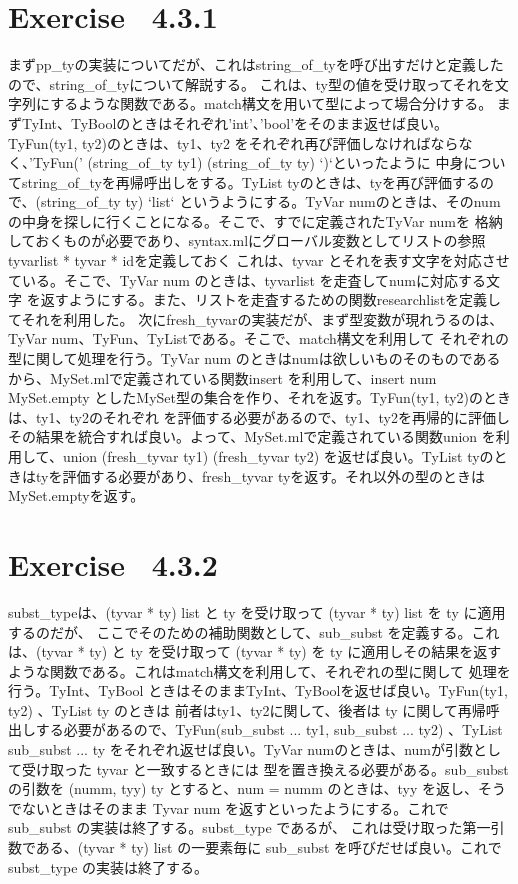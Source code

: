 \documentclass{jreport}
\begin{document}
\section{Exercise \ 4.3.1}
まずpp\_tyの実装についてだが、これはstring\_of\_tyを呼び出すだけと定義したので、string\_of\_tyについて解説する。
これは、ty型の値を受け取ってそれを文字列にするような関数である。match構文を用いて型によって場合分けする。
まずTyInt、TyBoolのときはそれぞれ'int'、'bool'をそのまま返せば良い。TyFun(ty1, ty2)のときは、ty1、ty2
をそれぞれ再び評価しなければならなく、'TyFun('  (string\_of\_ty ty1)  (string\_of\_ty ty) `)`といったように
中身についてstring\_of\_tyを再帰呼出しをする。TyList tyのときは、tyを再び評価するので、(string\_of\_ty ty) `list`
というようにする。TyVar numのときは、そのnumの中身を探しに行くことになる。そこで、すでに定義されたTyVar numを
格納しておくものが必要であり、syntax.mlにグローバル変数としてリストの参照tyvarlist * tyvar * idを定義しておく
これは、tyvar とそれを表す文字を対応させている。そこで、TyVar num のときは、tyvarlist を走査してnumに対応する文字
を返すようにする。また、リストを走査するための関数researchlistを定義してそれを利用した。
次にfresh\_tyvarの実装だが、まず型変数が現れうるのは、TyVar num、TyFun、TyListである。そこで、match構文を利用して
それぞれの型に関して処理を行う。TyVar num のときはnumは欲しいものそのものであるから、MySet.mlで定義されている関数insert
を利用して、insert num MySet.empty としたMySet型の集合を作り、それを返す。TyFun(ty1, ty2)のときは、ty1、ty2のそれぞれ
を評価する必要があるので、ty1、ty2を再帰的に評価しその結果を統合すれば良い。よって、MySet.mlで定義されている関数union
を利用して、union (fresh\_tyvar ty1) (fresh\_tyvar ty2) を返せば良い。TyList tyのときはtyを評価する必要があり、fresh\_tyvar tyを返す。それ以外の型のときはMySet.emptyを返す。
\section{Exercise \ 4.3.2}
subst\_typeは、(tyvar * ty) list と ty を受け取って (tyvar * ty) list を ty に適用するのだが、
ここでそのための補助関数として、sub\_subst を定義する。これは、(tyvar * ty) と ty を受け取って
(tyvar * ty) を ty に適用しその結果を返すような関数である。これはmatch構文を利用して、それぞれの型に関して
処理を行う。TyInt、TyBool ときはそのままTyInt、TyBoolを返せば良い。TyFun(ty1, ty2) 、TyList ty のときは
前者はty1、ty2に関して、後者は ty に関して再帰呼出しする必要があるので、TyFun(sub\_subst ... ty1, sub\_subst ... ty2)
、TyList sub\_subst ... ty をそれぞれ返せば良い。TyVar numのときは、numが引数として受け取った tyvar と一致するときには
型を置き換える必要がある。sub\_subst の引数を (numm, tyy) ty とすると、num = numm のときは、tyy を返し、そうでないときはそのまま Tyvar num を返すといったようにする。これで sub\_subst の実装は終了する。subst\_type であるが、
これは受け取った第一引数である、(tyvar * ty) list の一要素毎に sub\_subst を呼びだせば良い。これで subst\_type の実装は終了する。
\end{document}
